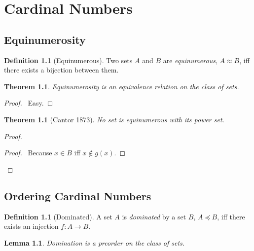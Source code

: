 \documentclass{report}
\let\qed\relax
\newtheorem{lemma}[axiom]{Lemma}
\newtheorem{theorem}[axiom]{Theorem}
\theoremstyle{definition}
\newtheorem{definition}[axiom]{Definition}
\begin{document}
    \chapter{Cardinal Numbers}

    \section{Equinumerosity}

    \begin{definition}[Equinumerous]
        Two sets $A$ and $B$ are \emph{equinumerous}, $A \approx B$, iff there exists a bijection between
        them.
    \end{definition}

    \begin{theorem}
        Equinumerosity is an equivalence relation on the class of sets.
    \end{theorem}

    \begin{proof}
        \pf\ Easy. \qed
    \end{proof}

    \begin{theorem}[Cantor 1873]
        No set is equinumerous with its power set.
    \end{theorem}

    \begin{proof}
        \pf
        \begin{proof}
            \pf\ Because $x \in B$ iff $x \notin g(x)$.
        \end{proof}
        \qed
    \end{proof}

    \section{Ordering Cardinal Numbers}

    \begin{definition}[Dominated]
        A set $A$ is \emph{dominated} by a set $B$, $A \preccurlyeq B$, iff there exists an injection
        $f : A \rightarrow B$.
    \end{definition}

    \begin{lemma}
        Domination is a preorder on the class of sets.
    \end{lemma}
\end{document}

